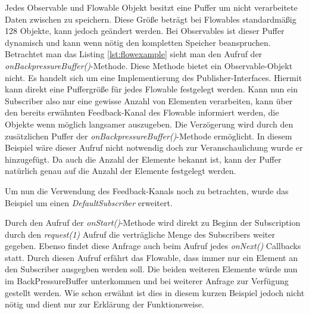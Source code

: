 Jedes Observable und Flowable Objekt besitzt eine Puffer um nicht verarbeitete Daten zwischen zu speichern. Diese Größe beträgt bei Flowables standardmäßig 128 Objekte, kann jedoch geändert werden. Bei Observables ist dieser Puffer dynamisch und kann wenn nötig den kompletten Speicher beanspruchen. Betrachtet man das Listing \ref{lst:flowexample} sieht man den Aufruf der \textit{onBackpressureBuffer()}-Methode. Diese Methode bietet ein Observable-Objekt nicht. Es handelt sich um eine Implementierung des Publisher-Interfaces. Hiermit kann direkt eine Puffergröße für jedes Flowable festgelegt werden. Kann nun ein Subscriber also nur eine gewisse Anzahl von Elementen verarbeiten, kann über den bereits erwähnten Feedback-Kanal des Flowable informiert werden, die Objekte wenn möglich langsamer auszugeben. Die Verzögerung wird durch den zusätzlichen Puffer der \textit{onBackpressureBuffer()}-Methode ermöglicht. In diesem Beispiel wäre dieser Aufruf nicht notwendig doch zur Veranschaulichung wurde er hinzugefügt. Da auch die Anzahl der Elemente bekannt ist, kann der Puffer natürlich genau auf die Anzahl der Elemente festgelegt werden.

Um nun die Verwendung des Feedback-Kanals noch zu betrachten, wurde das Beispiel um einen \textit{DefaultSubscriber} erweitert.

Durch den Aufruf der \textit{onStart()}-Methode wird direkt zu Beginn der Subscription durch den \textit{request(1)} Aufruf die verträgliche Menge des Subscribers weiter gegeben. Ebenso findet diese Anfrage auch beim Aufruf jedes \textit{onNext()} Callbacks statt. Durch diesen Aufruf erfährt das Flowable, dass immer nur ein Element an den Subscriber ausgegben werden soll. Die beiden weiteren Elemente würde nun im BackPressureBuffer unterkommen und bei weiterer Anfrage zur Verfügung gestellt werden. Wie schon erwähnt ist dies in diesem kurzen Beispiel jedoch nicht nötig und dient nur zur Erklärung der Funktionsweise.
